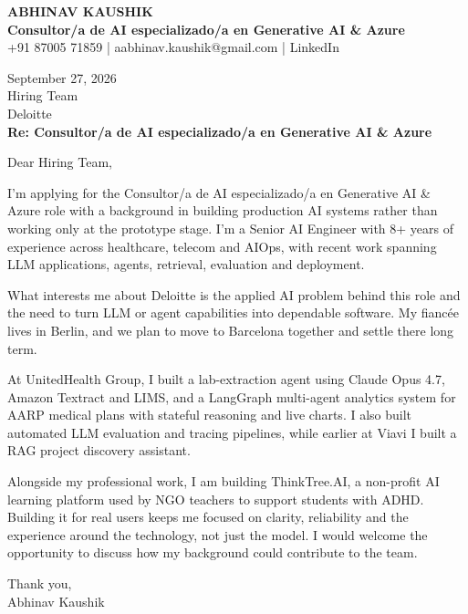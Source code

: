 \documentclass[10pt,a4paper]{article}
\begin{document}
\begin{center}
{\Large\bfseries ABHINAV KAUSHIK}\\[2pt]
{\bfseries Consultor/a de AI especializado/a en Generative AI \& Azure}\\[2pt]
+91 87005 71859 \quad | \quad aabhinav.kaushik@gmail.com \quad | \quad LinkedIn
\end{center}
\vspace{8pt}
September 27, 2026\\[6pt]
Hiring Team\\
Deloitte\\[4pt]
\textbf{Re: Consultor/a de AI especializado/a en Generative AI \& Azure}

Dear Hiring Team,

I’m applying for the Consultor/a de AI especializado/a en Generative AI \& Azure role with a background in building production AI systems rather than working only at the prototype stage. I’m a Senior AI Engineer with 8+ years of experience across healthcare, telecom and AIOps, with recent work spanning LLM applications, agents, retrieval, evaluation and deployment.

What interests me about Deloitte is the applied AI problem behind this role and the need to turn LLM or agent capabilities into dependable software. My fiancée lives in Berlin, and we plan to move to Barcelona together and settle there long term.

At UnitedHealth Group, I built a lab-extraction agent using Claude Opus 4.7, Amazon Textract and LIMS, and a LangGraph multi-agent analytics system for AARP medical plans with stateful reasoning and live charts. I also built automated LLM evaluation and tracing pipelines, while earlier at Viavi I built a RAG project discovery assistant.

Alongside my professional work, I am building ThinkTree.AI, a non-profit AI learning platform used by NGO teachers to support students with ADHD. Building it for real users keeps me focused on clarity, reliability and the experience around the technology, not just the model. I would welcome the opportunity to discuss how my background could contribute to the team.

Thank you,\\
Abhinav Kaushik
\end{document}

